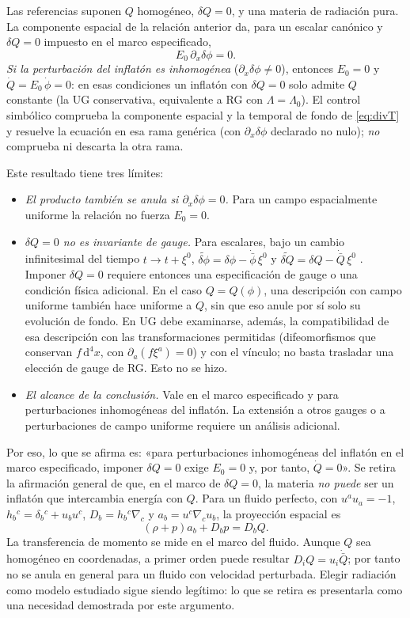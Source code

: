 Las referencias \cite{leon22,piccirilli23} suponen $Q$ homogéneo, $\delta Q=0$, y una materia de radiación pura. La componente espacial de la relación anterior da, para un escalar canónico y $\delta Q=0$ impuesto en el marco especificado,
\[
E_0\,\partial_x\delta\phi=0 .
\]
\emph{Si la perturbación del inflatón es inhomogénea} ($\partial_x\delta\phi\neq0$), entonces $E_0=0$ y $\dot Q=E_0\,\dot\phi=0$: en esas condiciones un inflatón con $\delta Q=0$ solo admite $Q$ constante (la UG conservativa, equivalente a RG con $\Lambda=\Lambda_0$). El control simbólico comprueba la componente espacial y la temporal de fondo de \eqref{eq:divT} y resuelve la ecuación en esa rama genérica (con $\partial_x\delta\phi$ declarado no nulo); \emph{no} comprueba ni descarta la otra rama.

Este resultado tiene tres límites:
\begin{itemize}[leftmargin=1.6em,itemsep=2pt]
\item \emph{El producto también se anula si $\partial_x\delta\phi=0$.} Para un campo espacialmente uniforme la relación no fuerza $E_0=0$.
\item \emph{$\delta Q=0$ no es invariante de gauge.} Para escalares, bajo un cambio infinitesimal del tiempo $t\to t+\xi^0$, $\widetilde{\delta\phi}=\delta\phi-\dot{\bar\phi}\,\xi^0$ y $\widetilde{\delta Q}=\delta Q-\dot{\bar Q}\,\xi^0$ . Imponer $\delta Q=0$ requiere entonces una especificación de gauge o una condición física adicional. En el caso $Q=Q(\phi)$, una descripción con campo uniforme también hace uniforme a $Q$, sin que eso anule por sí solo su evolución de fondo. En UG debe examinarse, además, la compatibilidad de esa descripción con las transformaciones permitidas (difeomorfismos que conservan $f\,\mathrm d^4x$, con $\partial_a(f\xi^a)=0$) y con el vínculo; no basta trasladar una elección de gauge de RG. Esto no se hizo.
\item \emph{El alcance de la conclusión.} Vale en el marco especificado y para perturbaciones inhomogéneas del inflatón. La extensión a otros gauges o a perturbaciones de campo uniforme requiere un análisis adicional.
\end{itemize}
Por eso, lo que se afirma es: «para perturbaciones inhomogéneas del inflatón en el marco especificado, imponer $\delta Q=0$ exige $E_0=0$ y, por tanto, $\dot Q=0$». Se retira la afirmación general de que, en el marco de $\delta Q=0$, la materia \emph{no puede} ser un inflatón que intercambia energía con $Q$. Para un fluido perfecto, con $u^a u_a=-1$, $h_b{}^c=\delta_b{}^c+u_bu^c$, $D_b=h_b{}^c\nabla_c$ y $a_b=u^c\nabla_cu_b$, la proyección espacial es
\[
(\rho+p)a_b+D_bp=D_bQ.
\]
La transferencia de momento se mide en el marco del fluido. Aunque $Q$ sea homogéneo en coordenadas, a primer orden puede resultar $D_iQ=u_i\dot{\bar Q}$; por tanto no se anula en general para un fluido con velocidad perturbada. Elegir radiación como modelo estudiado sigue siendo legítimo: lo que se retira es presentarla como una necesidad demostrada por este argumento.

